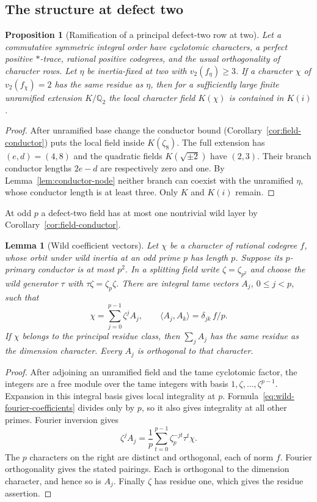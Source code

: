 \documentclass[11pt,a4paper]{article}
\numberwithin{equation}{section}
\newtheorem{proposition}[theorem]{Proposition}
\newtheorem{lemma}[theorem]{Lemma}
\theoremstyle{remark}
\newcommand{\QQ}{\mathbb Q}
\begin{document}
\subsection{The structure at defect two}\label{fam:M:sec:5.4}
\begin{proposition}[Ramification of a principal defect-two row at two]\label{fam:M:5.8}
\label{prop:principal-two-defect-two-ramification}
Let a commutative symmetric integral order have cyclotomic characters,
a perfect positive $*$-trace, rational positive codegrees, and the
usual orthogonality of character rows. Let $\eta$ be inertia-fixed
at two with $v_2(f_\eta)\ge3$. If a character $\chi$ of
$v_2(f_\chi)=2$ has the same residue as $\eta$, then for a
sufficiently large finite unramified extension $K/\QQ_2$ the local
character field $K(\chi)$ is contained in $K(i)$.
\end{proposition}
\begin{proof}
After unramified base change the conductor bound
(Corollary~\ref{cor:field-conductor}) puts the local field inside
$K(\zeta_8)$. The full extension has $(e,d)=(4,8)$ and the quadratic
fields $K(\sqrt{\pm2})$ have $(2,3)$. Their branch conductor
lengths $2e-d$ are respectively zero and one. By
Lemma~\ref{lem:conductor-node} neither branch can coexist with the
unramified $\eta$, whose conductor length is at least three.
Only $K$ and $K(i)$ remain.
\end{proof}

At odd $p$ a defect-two field has at most one nontrivial wild layer
by Corollary~\ref{cor:field-conductor}.
\begin{lemma}[Wild coefficient vectors]\label{fam:M:5.9}\label{lem:wild-coefficient-vectors}
Let $\chi$ be a character of rational codegree $f$, whose orbit under
wild inertia at an odd prime $p$ has length $p$. Suppose its
$p$-primary conductor is at most $p^2$. In a splitting field write
$\zeta=\zeta_{p^2}$ and choose the wild generator $\tau$ with
$\tau\zeta=\zeta_p\zeta$. There are integral tame vectors $A_j$,
$0\le j<p$, such that
\[
 \chi=\sum_{j=0}^{p-1}\zeta^j A_j,\qquad
 \langle A_j,A_k\rangle=\delta_{jk}\,f/p.
\]
If $\chi$ belongs to the principal residue class, then
$\sum_j A_j$ has the same residue as the dimension character.
Every $A_j$ is orthogonal to that character.
\end{lemma}
\begin{proof}
After adjoining an unramified field and the tame cyclotomic factor,
the integers are a free module over the tame integers with basis
$1,\zeta,\ldots,\zeta^{p-1}$. Expansion in this integral basis gives local integrality at $p$.
Formula~\eqref{eq:wild-fourier-coefficients} divides only by $p$, so it also gives
integrality at all other primes. Fourier inversion gives
\begin{equation}\label{eq:wild-fourier-coefficients}
 \zeta^jA_j=\frac1p\sum_{t=0}^{p-1}\zeta_p^{-jt}\tau^t\chi.
\end{equation}
The $p$ characters on the right are distinct and orthogonal, each
of norm $f$. Fourier orthogonality gives the stated pairings.
Each is orthogonal to the dimension character, and hence so is $A_j$.
Finally $\zeta$ has residue one, which gives the residue assertion.
\end{proof}
\end{document}
